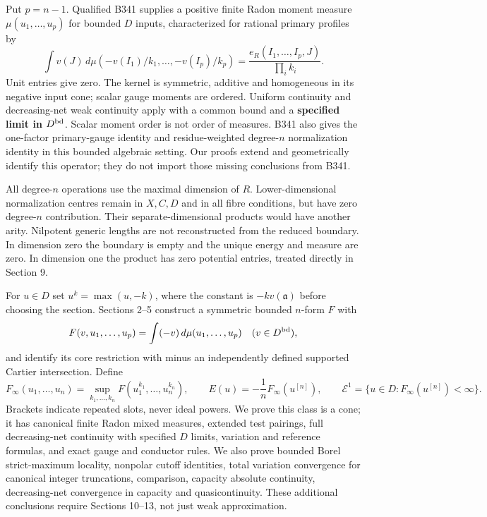 \documentclass[
]{article}
\begin{document}
Put \(p=n-1\). Qualified B341 supplies a positive finite Radon moment
measure \(\mu(u_1,\ldots,u_p)\) for bounded \(D\) inputs, characterized
for rational primary profiles by
\[\int v(J)\,d\mu(-v(I_1)/k_1,\ldots,-v(I_p)/k_p)
=\frac{e_R(I_1,\ldots,I_p,J)}{\prod_i k_i}.\] Unit entries give zero.
The kernel is symmetric, additive and homogeneous in its negative input
cone; scalar gauge moments are ordered. Uniform continuity and
decreasing-net weak continuity apply with a common bound and a
\textbf{specified limit in \(D^{\rm bd}\)}. Scalar moment order is not
order of measures. B341 also gives the one-factor primary-gauge identity
and residue-weighted degree-\(n\) normalization identity in this bounded
algebraic setting. Our proofs extend and geometrically identify this
operator; they do not import those missing conclusions from B341.

All degree-\(n\) operations use the maximal dimension of \(R\).
Lower-dimensional normalization centres remain in \(X,C,D\) and in all
fibre conditions, but have zero degree-\(n\) contribution. Their
separate-dimensional products would have another arity. Nilpotent
generic lengths are not reconstructed from the reduced boundary. In
dimension zero the boundary is empty and the unique energy and measure
are zero. In dimension one the product has zero potential entries,
treated directly in Section 9.

For \(u\in D\) set \(u^k=\max(u,-k)\), where the constant is
\(-k v(\mathfrak a)\) before choosing the section. Sections 2--5
construct a symmetric bounded \(n\)-form \(F\) with
\[F(v,u_1,\ldots,u_p)=\int(-v)\,d\mu(u_1,\ldots,u_p)\quad(v\in D^{\rm bd}),\]
and identify its core restriction with minus an independently defined
supported Cartier intersection. Define
\[F_\infty(u_1,\ldots,u_n)=\sup_{k_1,\ldots,k_n}F(u_1^{k_1},\ldots,u_n^{k_n}),\qquad
E(u)=-\frac1n F_\infty(u^{[n]}),\qquad
\mathcal E^1=\{u\in D:F_\infty(u^{[n]})<\infty\}.\] Brackets indicate
repeated slots, never ideal powers. We prove this class is a cone; it
has canonical finite Radon mixed measures, extended test pairings, full
decreasing-net continuity with specified \(D\) limits, variation and
reference formulas, and exact gauge and conductor rules. We also prove
bounded Borel strict-maximum locality, nonpolar cutoff identities, total
variation convergence for canonical integer truncations, comparison,
capacity absolute continuity, decreasing-net convergence in capacity and
quasicontinuity. These additional conclusions require Sections 10--13,
not just weak approximation.
\end{document}
